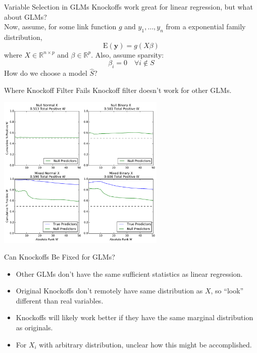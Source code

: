 \documentclass{beamer}
\newcommand{\R}{\mathbb{R}}
\newcommand{\E}{\mathrm{E}}
\begin{document}
\begin{frame}{Variable Selection in GLMs}
    Knockoffs work great for linear regression, but what about GLMs? \\
    \vspace{1cm}
    Now, assume, for some link function $g$ and $y_1,\ldots,y_n$ from a exponential family distribution,
     \[\E(\mathbf{y}) = g(X\beta)\]
    where $X \in \R^{n\times p}$ and $\beta\in\R^p$. Also, assume sparsity:
    \[\beta_i = 0 \quad \forall i\not\in S\]
    How do we choose a model $\hat S$?
\end{frame}

\begin{frame}{Where Knockoff Filter Fails}
    Knockoff filter doesn't work for other GLMs. \\
    \begin{center}
        \includegraphics[width=8cm]{images/entryrate_original_logit}
    \end{center}
\end{frame}

\begin{frame}{Can Knockoffs Be Fixed for GLMs?}
    \begin{itemize}
        \item Other GLMs don't have the same sufficient statistics as linear regression.
        \item Original Knockoffs don't remotely have same distribution as $X$, so ``look'' different than real variables.
        \item Knockoffs will likely work better if they have the same marginal distribution as originals. 
        \item For $X_i$ with arbitrary distribution, unclear how this might be accomplished.
    \end{itemize}
\end{frame}
\end{document}
